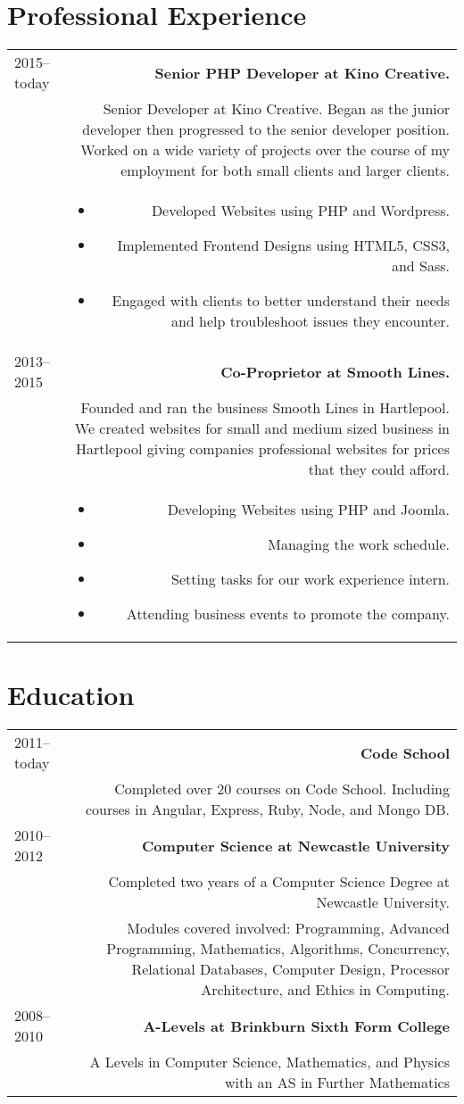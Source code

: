 \documentclass[10pt]{article}
\begin{document}
\section*{Professional Experience}
\begin{tabular}{L!{\VRule}R}
2015--today&{\bf Senior PHP Developer at Kino Creative.}\\
&Senior Developer at Kino Creative. Began as the junior developer then progressed to the senior developer position. Worked on a wide variety of projects over the course of my employment for both small clients and larger clients.\\
&\begin{itemize}
\item Developed Websites using PHP and Wordpress.
\item Implemented Frontend Designs using HTML5, CSS3, and Sass.
\item Engaged with clients to better understand their needs and help troubleshoot issues they encounter.
\end{itemize}\\
2013--2015&{\bf Co-Proprietor at Smooth Lines.}\\
&Founded and ran the business Smooth Lines in Hartlepool. We created websites for small and medium sized business in Hartlepool giving companies professional websites for prices that they could afford.\\
&\begin{itemize}
\item Developing Websites using PHP and Joomla.
\item Managing the work schedule.
\item Setting tasks for our work experience intern.
\item Attending business events to promote the company.
\end{itemize}\\
\end{tabular}

\section*{Education}
\begin{tabular}{L!{\VRule}R}
2011--today&{\bf Code School}\\
&Completed over 20 courses on Code School. Including courses in Angular, Express, Ruby, Node, and Mongo DB.\\
2010--2012&{\bf Computer Science at Newcastle University}\\
&Completed two years of a Computer Science Degree at Newcastle University.\\
&Modules covered involved: Programming, Advanced Programming, Mathematics, Algorithms, Concurrency, Relational Databases, Computer Design, Processor Architecture, and Ethics in Computing.\\
2008--2010&{\bf A-Levels at Brinkburn Sixth Form College}\\
&A Levels in Computer Science, Mathematics, and Physics with an AS in Further Mathematics
\end{tabular}
\end{document}
